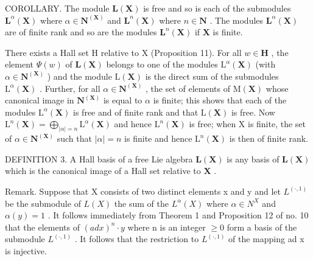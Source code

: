 COROLLARY. The module \(\mathbf{L}(\mathbf{X})\) is free and so is each of the submodules \(\mathbf{L}^{\alpha}(\mathbf{X})\) where \(\alpha \in \mathbf{N}^{(\mathbf{X})}\) and \(\mathbf{L}^n (\mathbf{X})\) where \(n\in \mathbf{N}\) . The modules \(\mathbf{L}^{\alpha}(\mathbf{X})\) are of finite rank and so are the modules \(\mathbf{L}^n (\mathbf{X})\) if \(\mathbf{X}\) is finite.

There exists a Hall set H relative to X (Proposition 11). For all \(w \in \mathbf{H}\) , the element \(\Psi(w)\) of \(\mathbf{L}(\mathbf{X})\) belongs to one of the modules \(\mathrm{L}^{\alpha}(\mathbf{X})\) (with \(\alpha \in \mathbf{N}^{(\mathbf{X})}\) ) and the module \(\mathrm{L}(\mathbf{X})\) is the direct sum of the submodules \(\mathrm{L}^{\alpha}(\mathbf{X})\) . Further, for all \(\alpha \in \mathbf{N}^{(\mathbf{X})}\) , the set of elements of \(\mathrm{M}(\mathbf{X})\) whose canonical image in \(\mathbf{N}^{(\mathbf{X})}\) is equal to \(\alpha\) is finite; this shows that each of the modules \(\mathrm{L}^{\alpha}(\mathbf{X})\) is free and of finite rank and that \(\mathrm{L}(\mathbf{X})\) is free. Now \(\mathrm{L}^{n}(\mathbf{X}) = \bigoplus_{|\alpha| = n} \mathrm{L}^{\alpha}(\mathbf{X})\) and hence \(\mathrm{L}^{n}(\mathbf{X})\) is free; when X is finite, the set of \(\alpha \in \mathbf{N}^{(\mathbf{X})}\) such that \(|\alpha| = n\) is finite and hence \(\mathrm{L}^{n}(\mathbf{X})\) is then of finite rank.

DEFINITION 3. A Hall basis of a free Lie algebra \(\mathbf{L}(\mathbf{X})\) is any basis of \(\mathbf{L}(\mathbf{X})\) which is the canonical image of a Hall set relative to \(\mathbf{X}\) .

Remark. Suppose that X consists of two distinct elements x and y and let \(L^{(\cdot,1)}\) be the submodule of \(L(X)\) the sum of the \(L^{\alpha}(X)\) where \(\alpha\in N^{X}\) and \(\alpha(y)=1\) . It follows immediately from Theorem 1 and Proposition 12 of no. 10 that the elements of \((ad x)^{n}\cdot y\) where n is an integer \(\geqslant0\) form a basis of the submodule \(L^{(\cdot,1)}\) . It follows that the restriction to \(L^{(\cdot,1)}\) of the mapping ad x is injective.

